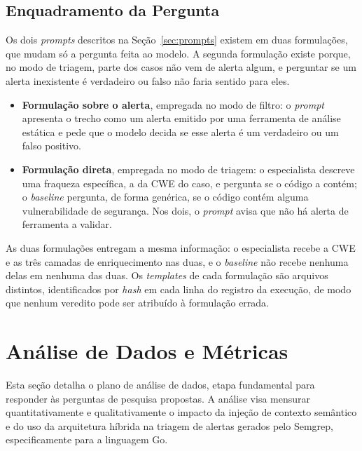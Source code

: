 \subsection{Enquadramento da Pergunta}
\label{subsec:enquadramento}
Os dois \textit{prompts} descritos na Seção~\ref{sec:prompts} existem em duas formulações, que mudam só a pergunta feita ao modelo. A segunda formulação existe porque, no modo de triagem, parte dos casos não vem de alerta algum, e perguntar se um alerta inexistente é verdadeiro ou falso não faria sentido para eles.
\begin{itemize}
    \item \textbf{Formulação sobre o alerta}, empregada no modo de filtro: o \textit{prompt} apresenta o trecho como um alerta emitido por uma ferramenta de análise estática e pede que o modelo decida se esse alerta é um verdadeiro ou um falso positivo.
    \item \textbf{Formulação direta}, empregada no modo de triagem: o especialista descreve uma fraqueza específica, a da CWE do caso, e pergunta se o código a contém; o \textit{baseline} pergunta, de forma genérica, se o código contém alguma vulnerabilidade de segurança. Nos dois, o \textit{prompt} avisa que não há alerta de ferramenta a validar.
\end{itemize}

As duas formulações entregam a mesma informação: o especialista recebe a CWE e as três camadas de enriquecimento nas duas, e o \textit{baseline} não recebe nenhuma delas em nenhuma das duas. Os \textit{templates} de cada formulação são arquivos distintos, identificados por \textit{hash} em cada linha do registro da execução, de modo que nenhum veredito pode ser atribuído à formulação errada.


\section{Análise de Dados e Métricas}
\label{sec:metricas}
Esta seção detalha o plano de análise de dados, etapa fundamental para responder às perguntas de pesquisa propostas. A análise visa mensurar quantitativamente e qualitativamente o impacto da injeção de contexto semântico e do uso da arquitetura híbrida na triagem de alertas gerados pelo Semgrep, especificamente para a linguagem Go.

